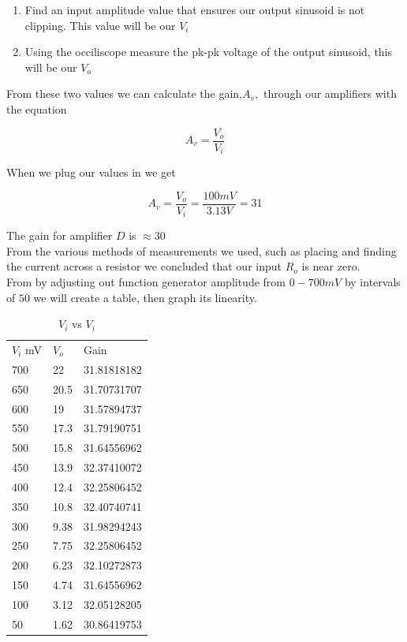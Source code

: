 \documentclass[12pt]{article}
\begin{document}
\begin{enumerate}
	\item Find an input amplitude value that ensures our output sinusoid is not clipping. This value will be our $V_i$
	\item Using the occiliscope measure the pk-pk voltage of the output sinusoid, this will be our $V_o$
\end{enumerate}
From these two values we can calculate the gain,$A_v,$ through our amplifiers with the equation

$$A_v = \frac{V_o}{V_i}$$

When we plug our values in we get

$$A_v = \frac{V_o}{V_i} = \frac{100mV}{3.13V} = 31$$

The gain for amplifier $D$ is $\approx 30$\\

From the various methods of measurements we used, such as placing and finding the current across a resistor we concluded that our input $R_o$ is near zero.\\

From by adjusting out function generator amplitude from $0-700mV$ by intervals of $50$ we will create a table, then graph its linearity.

\begin{table}[h]
	\centering
	\caption{$V_i$ vs $V_i$}
	\label{my-label}
	\begin{tabular}{lll}
		$V_i$ mV & $V_o$ & Gain        \\
		700          & 22    & 31.81818182 \\
		650          & 20.5  & 31.70731707 \\
		600          & 19    & 31.57894737 \\
		550          & 17.3  & 31.79190751 \\
		500          & 15.8  & 31.64556962 \\
		450          & 13.9  & 32.37410072 \\
		400          & 12.4  & 32.25806452 \\
		350          & 10.8  & 32.40740741 \\
		300          & 9.38  & 31.98294243 \\
		250          & 7.75  & 32.25806452 \\
		200          & 6.23  & 32.10272873 \\
		150          & 4.74  & 31.64556962 \\
		100          & 3.12  & 32.05128205 \\
		50           & 1.62  & 30.86419753
	\end{tabular}
\end{table}
\newpage
\end{document}
